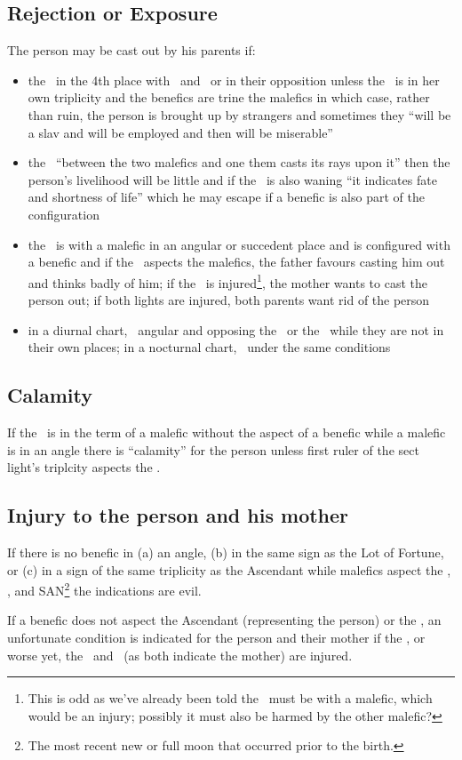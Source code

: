 \subsection{Rejection or Exposure}
The person may be cast out by his parents if:
\begin{itemize}
\item the \Moon\, in the 4th place with \Saturn\, and \Mars\, or in their opposition unless the \Moon\, is in her own triplicity and the benefics are trine the malefics in which case, rather than ruin, the person is brought up by strangers and sometimes they ``will be a slav and will be employed and then will be miserable''

\item the \Moon\, ``between the two malefics and one them casts its rays upon it'' then the person's livelihood will be little and if the \Moon\, is also waning ``it indicates fate and shortness of life'' which he may escape if a benefic is also part of the configuration

\item the \Moon\, is with a malefic in an angular or succedent place and is configured with a benefic and if the \Sun\, aspects the malefics, the father favours casting him out and thinks badly of him; if the \Moon\, is injured\footnote{This is odd as we've already been told the \Moon\, must be with a malefic, which would be an injury; possibly it must also be harmed by the other malefic?}, the mother wants to cast the person out; if both lights are injured, both parents want rid of the person

\item in a diurnal chart, \Mars\, angular and opposing the \Moon\, or the \Sun\, while they are not in their own places; in a nocturnal chart, \Saturn\, under the same conditions
\end{itemize}

\subsection{Calamity}

If the \Moon\, is in the term of a malefic without the aspect of a benefic while a malefic is in an angle there is ``calamity'' for the person unless first ruler of the sect light's triplcity aspects the \Moon.

\subsection{Injury to the person and his mother}

If there is no benefic in (a) an angle, (b) in the same sign as the Lot of Fortune, or (c) in a sign of the same triplicity as the Ascendant while malefics aspect the \Sun, \Moon, and SAN\footnote{The most recent new or full moon that occurred prior to the birth.} the indications are evil.

If a benefic does not aspect the Ascendant (representing the person) or the \Moon, an unfortunate condition is indicated for the person and their mother if the \Moon, or worse yet, the \Moon\, and \Venus\, (as both indicate the mother) are injured.

